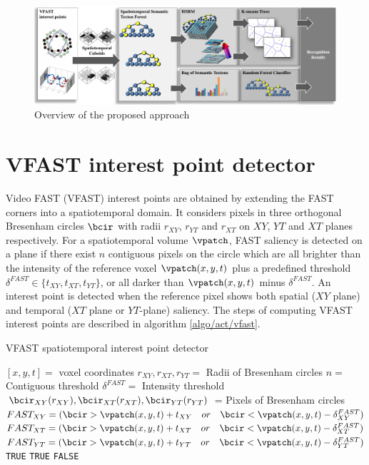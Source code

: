 \begin{figure}[ht]
	\centering  	
	\includegraphics[width=1.0\linewidth]{fig/act/fig1_new4.pdf}
	\caption{Overview of the proposed approach}
	\label{fig/act/flow}
\end{figure}

\section{VFAST interest point detector}
\label{sec/act/fastest}
Video FAST (VFAST) interest points are obtained by extending the FAST corners \cite{Rosten2006} into a spatiotemporal domain. It considers pixels in three orthogonal Bresenham circles $\bcir$ with radii $r_{XY}$, $r_{YT}$ and $r_{XT}$ on $XY$, $YT$ and $XT$ planes respectively.
For a spatiotemporal volume $\vpatch$, FAST saliency is detected on a plane if there exist $n$ contiguous pixels on the circle which are all brighter than the intensity of the reference voxel $\vpatch(x,y,t)$ plus a predefined threshold $\delta^{FAST} \in \{ t_{XY}, t_{XT}, t_{YT} \}$, or all darker than $\vpatch(x,y,t)$ minus $\delta^{FAST}$. An interest point is detected when the reference pixel shows both spatial ($XY$ plane) and temporal ($XT$ plane or $YT$-plane) saliency. The steps of computing VFAST interest points are described in algorithm \ref{algo/act/vfast}.

\begin{algorithm}
\caption{VFAST spatiotemporal interest point detector}
\label{algo/act/vfast}
\begin{algorithmic}
	\REQUIRE $[x,y,t] = $ voxel coordinates
	\REQUIRE $r_{XY},r_{XT},r_{YT} = $ Radii of Bresenham circles
	\REQUIRE $n = $ Contiguous threshold
	\REQUIRE $\delta^{FAST} = $ Intensity threshold
	\STATE $\bcir_{XY}(r_{XY}),\bcir_{XT}(r_{XT}),\bcir_{YT}(r_{YT})$ = Pixels of Bresenham circles
	\STATE $FAST_{XY} = ( \bcir > \vpatch(x,y,t)+t_{XY}\quad or\quad \bcir < \vpatch(x,y,t)-\delta^{FAST}_{XY} )$
	\STATE $FAST_{XT} = ( \bcir > \vpatch(x,y,t)+t_{XT}\quad or\quad \bcir < \vpatch(x,y,t)-\delta^{FAST}_{XT} )$
	\STATE $FAST_{YT} = ( \bcir > \vpatch(x,y,t)+t_{YT}\quad or\quad \bcir < \vpatch(x,y,t)-\delta^{FAST}_{YT} )$
		\RETURN \texttt{TRUE}
		\RETURN \texttt{TRUE}
	\ELSE
		\RETURN \texttt{FALSE}
	\ENDIF
\ENDIF
\end{algorithmic}
\end{algorithm}

